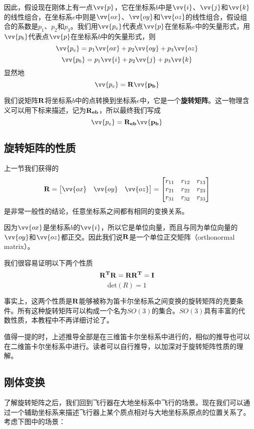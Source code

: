 \documentclass[11pt]{article}
\begin{document}
因此，假设现在刚体上有一点$\vv{p}$，它在坐标系$b$中是$\vv{i}$、$\vv{j}$和$\vv{k}$的线性组合，在坐标系$e$中则是$\vv{ox}$、$\vv{oy}$和$\vv{oz}$的线性组合，假设组合的系数是$p_1$、$p_2$和$p_3$。我们用$\vv{p_e}$代表点$\vv{p}$在坐标系$e$中的矢量形式，用$\vv{p_b}$代表点$\vv{p}$在坐标系$b$中的矢量形式，则
$$
\vv{p_e} = p_1\vv{ox}+p_2\vv{oy}+p_3\vv{oz}
$$
$$
\vv{p_b} = p_1\vv{i}+p_2\vv{j}+p_3\vv{k}
$$
显然地
$$
\vv{p_e} = \bf{R}\vv{p_b}
$$

我们说矩阵$\bf{R}$将坐标系$b$中的点转换到坐标系$e$中，它是一个\textbf{旋转矩阵}。这一物理含义可以用下标来描述，记为$\bf{R}_{eb}$，所以最终我们写成
$$
\vv{p_e} = \bf{R}_{eb}\vv{p_b}
$$

\subsection{旋转矩阵的性质}
上一节我们获得的
$$
\bf{R} = \begin{bmatrix}
\vv{ox} & \vv{oy} & \vv{oz}\\
\end{bmatrix}
= \begin{bmatrix}
r_{11} & r_{12} & r_{13}\\
r_{21} & r_{22} & r_{23}\\
r_{31} & r_{32} & r_{33}
\end{bmatrix}
$$
是非常一般性的结论，任意坐标系之间都有相同的变换关系。

因为$\vv{ox}$是坐标系$b$的$\vv{i}$，所以它是单位向量，而且与同为单位向量的$\vv{oy}$和$\vv{oz}$都正交。因此我们说$\bf{R}$是一个单位正交矩阵（orthonormal matrix）。

我们很容易证明以下两个性质
$$
\bf{R}^T\bf{R} = \bf{R}\bf{R}^T = \bf{I}
$$
$$
\text{det}(R) = 1
$$

事实上，这两个性质是$\bf{R}$能够被称为笛卡尔坐标系之间变换的旋转矩阵的充要条件。所有这种旋转矩阵可以构成一个名为$SO(3)$的集合。$SO(3)$具有丰富的代数性质，本教程中不再详细讨论了。

值得一提的时，上述推导全部是在三维笛卡尔坐标系中进行的，相似的推导也可以在二维笛卡尔坐标系中进行。读者可以自行推导，以加深对于旋转矩阵性质的理解。

\subsection{刚体变换}
了解旋转矩阵之后，我们回到飞行器在大地坐标系中飞行的场景。现在我们可以通过一个辅助坐标系来描述飞行器上某个质点相对与大地坐标系原点的位置关系了。考虑下图中的场景：
\end{document}
